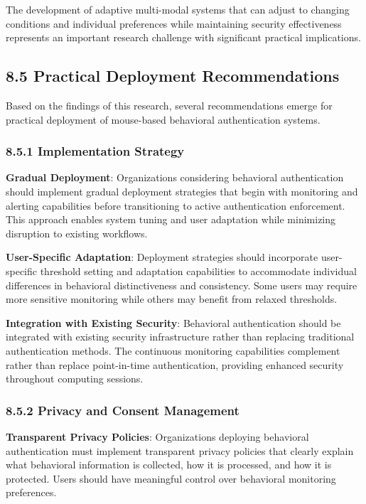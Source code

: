 \documentclass[
  11pt,
  a4paper,
]{article}
\begin{document}
The development of adaptive multi-modal systems that can adjust to
changing conditions and individual preferences while maintaining
security effectiveness represents an important research challenge with
significant practical implications.

\subsection{8.5 Practical Deployment
Recommendations}\label{practical-deployment-recommendations}

Based on the findings of this research, several recommendations emerge
for practical deployment of mouse-based behavioral authentication
systems.

\subsubsection{8.5.1 Implementation
Strategy}\label{implementation-strategy}

\textbf{Gradual Deployment}: Organizations considering behavioral
authentication should implement gradual deployment strategies that begin
with monitoring and alerting capabilities before transitioning to active
authentication enforcement. This approach enables system tuning and user
adaptation while minimizing disruption to existing workflows.

\textbf{User-Specific Adaptation}: Deployment strategies should
incorporate user-specific threshold setting and adaptation capabilities
to accommodate individual differences in behavioral distinctiveness and
consistency. Some users may require more sensitive monitoring while
others may benefit from relaxed thresholds.

\textbf{Integration with Existing Security}: Behavioral authentication
should be integrated with existing security infrastructure rather than
replacing traditional authentication methods. The continuous monitoring
capabilities complement rather than replace point-in-time
authentication, providing enhanced security throughout computing
sessions.

\subsubsection{8.5.2 Privacy and Consent
Management}\label{privacy-and-consent-management}

\textbf{Transparent Privacy Policies}: Organizations deploying
behavioral authentication must implement transparent privacy policies
that clearly explain what behavioral information is collected, how it is
processed, and how it is protected. Users should have meaningful control
over behavioral monitoring preferences.
\end{document}
